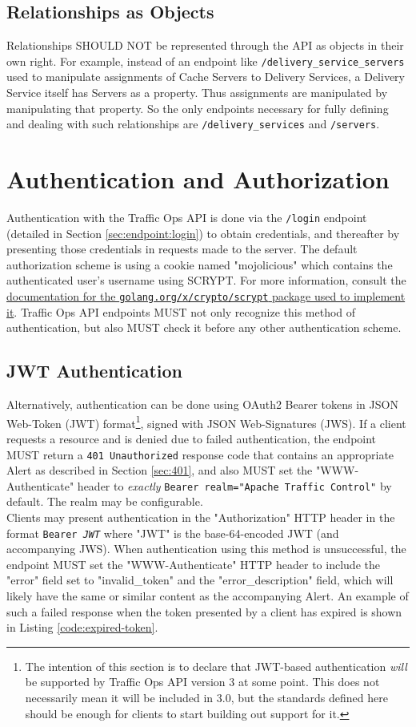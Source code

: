 \documentclass{article}
\newcommand{\code}[1]{\texttt{\color{inlinecodecolor}#1}}
\begin{document}
\subsection{Relationships as Objects}
Relationships SHOULD NOT be represented through the API as objects in their own right. For example, instead of an endpoint like
\code{/delivery\_service\_servers} used to manipulate assignments of Cache Servers to Delivery Services, a Delivery Service itself
has Servers as a property. Thus assignments are manipulated by manipulating that property. So the only endpoints necessary for fully
defining and dealing with such relationships are \code{/delivery\_services} and \code{/servers}.

\section{Authentication and Authorization}
Authentication with the Traffic Ops API is done via the \code{/login} endpoint (detailed in Section \ref{sec:endpoint:login}) to obtain
credentials, and thereafter by presenting those credentials in requests made to the server. The default authorization scheme is using a
cookie named "mojolicious" which contains the authenticated user's username using SCRYPT. For more information, consult the
\href{https://godoc.org/golang.org/x/crypto/scrypt}{documentation for the \code{golang.org/x/crypto/scrypt} package used to implement it}.
Traffic Ops API endpoints MUST not only recognize this method of authentication, but also MUST check it before any other authentication
scheme.\\

\subsection{JWT Authentication}
Alternatively, authentication can be done using OAuth2 Bearer tokens in JSON Web-Token (JWT) format\footnote{The intention of this section
is to declare that JWT-based authentication \emph{will} be supported by Traffic Ops API version 3 at some point. This does not necessarily
mean it will be included in 3.0, but the standards defined here should be enough for clients to start building out support for it.},
signed with JSON Web-Signatures (JWS). If a client requests a resource and is denied due to failed authentication, the endpoint MUST
return a \code{401 Unauthorized} response code that contains an appropriate Alert as described in Section \ref{sec:401}, and also MUST set
the "WWW-Authenticate" header to \emph{exactly} \code{Bearer realm="Apache Traffic Control"} by default. The realm may be configurable.\\
Clients may present authentication in the "Authorization" HTTP header in the format \code{Bearer \emph{JWT}} where "JWT" is the
base-64-encoded JWT (and accompanying JWS). When authentication using this method is unsuccessful, the endpoint MUST set the "WWW-Authenticate"
HTTP header to include the "error" field set to "invalid\_token" and the "error\_description" field, which will likely have the same or similar
content as the accompanying Alert. An example of such a failed response when the token presented by a client has expired is shown in Listing
\ref{code:expired-token}.\newpage{}
\end{document}
